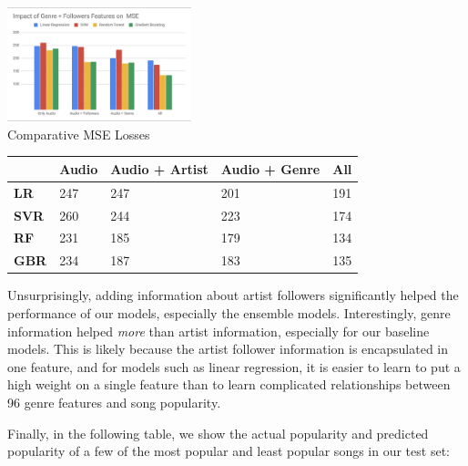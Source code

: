 \documentclass[journal]{IEEEtran}
\begin{document}
\begin{center}
\includegraphics[width = 0.4\textwidth]{images/221_model_comparison.png} \\

\caption{Comparative MSE Losses}
\centering
\label{my-label}
\begin{tabular}{|l|l|l|l|l|}
\hline
\textbf{} & Audio  & Audio + Artist  & Audio + Genre  & All    \\ \hline
\textbf{LR}   & 247 & 247 & 201 & 191 \\ \hline
\textbf{SVR}   & 260 & 244 & 223 & 174 \\ \hline
\textbf{RF}   & 231 & 185 & 179 & 134 \\ \hline
\textbf{GBR}   & 234 & 187 & 183 & 135 \\ \hline
\end{tabular}
\end{center}

\quad\newline
Unsurprisingly, adding information about artist followers significantly helped the performance of our models, especially the ensemble models. Interestingly, genre information helped \textit{more} than artist information, especially for our baseline models. This is likely because the artist follower information is encapsulated in one feature, and for models such as linear regression, it is easier to learn to put a high weight on a single feature than to learn complicated relationships between 96 genre features and song popularity. 

Finally, in the following table, we show the actual popularity and predicted popularity of a few of the most popular and least popular songs in our test set:
\end{document}
